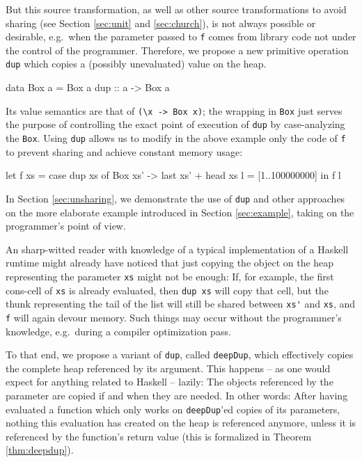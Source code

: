 \documentclass[preprint]{sigplanconf}
\theoremstyle{nonumberplain}
\newcommand{\li}{\lstinline[style=Haskell]}
\begin{document}
But this source transformation, as well as other source transformations to avoid sharing (see Section \ref{sec:unit} and \ref{sec:church}), is not always possible or desirable, e.g.\  when the parameter passed to \li-f- comes from library code not under the control of the programmer. Therefore, we propose a new primitive operation \li-dup- which copies a (possibly unevaluated) value on the heap.
\begin{haskell}
data Box a = Box a
dup :: a -> Box a
\end{haskell}
Its value semantics are that of \li!(\x -> Box x)!; the wrapping in \li-Box- just serves the purpose of controlling the exact point of execution of \li-dup- by case-analyzing the \li-Box-. Using \li-dup- allows us to modify in the above example only the code of \li-f- to prevent sharing and achieve constant memory usage:
\begin{haskell}
let f xs = case dup xs of
    	Box xs' -> last xs' + head xs
    l = [1..100000000]
in  f l
\end{haskell}
In Section \ref{sec:unsharing}, we demonstrate the use of \li-dup- and other approaches on the more elaborate example introduced in Section \ref{sec:example}, taking on the programmer’s point of view.

An sharp-witted reader with knowledge of a typical implementation of a Haskell runtime might already have noticed that just copying the object on the heap representing the parameter \li-xs- might not be enough: If, for example, the first cons-cell of \li-xs- is already evaluated, then \li-dup xs- will copy that cell, but the thunk representing the tail of the list will still be shared between \li-xs'- and \li-xs-, and \li-f- will again devour memory. Such things may occur without the programmer’s knowledge, e.g.\ during a compiler optimization pass.

To that end, we propose a variant of \li-dup-, called \li-deepDup-, which effectively copies the complete heap referenced by its argument. This happens -- as one would expect for anything related to Haskell -- lazily: The objects referenced  by the parameter are copied if and when they are needed. In other words: After having evaluated a function which only works on \li-deepDup-’ed copies of its parameters, nothing this evaluation has created on the heap is referenced anymore, unless it is referenced by the function's return value (this is formalized in Theorem \ref{thm:deepdup}).
\end{document}
